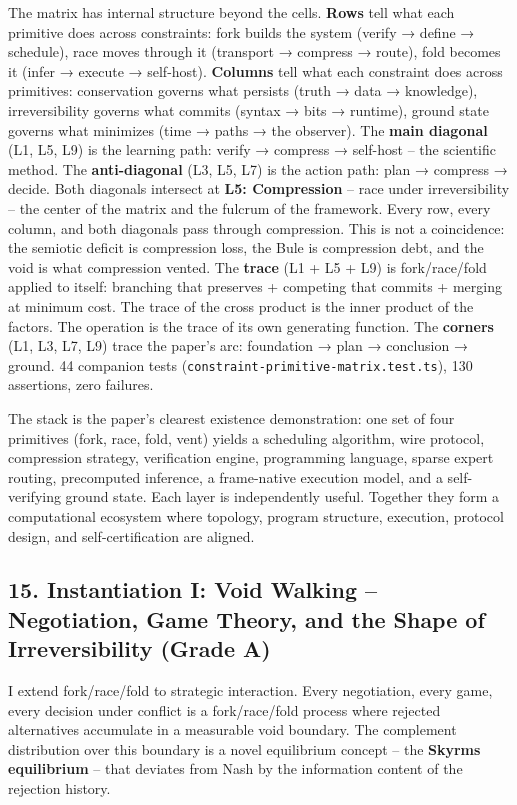 \documentclass[
  11pt,
]{article}
\begin{document}
The matrix has internal structure beyond the cells. \textbf{Rows} tell
what each primitive does across constraints: fork builds the system
(verify → define → schedule), race moves through it (transport →
compress → route), fold becomes it (infer → execute → self-host).
\textbf{Columns} tell what each constraint does across primitives:
conservation governs what persists (truth → data → knowledge),
irreversibility governs what commits (syntax → bits → runtime), ground
state governs what minimizes (time → paths → the observer). The
\textbf{main diagonal} (L1, L5, L9) is the learning path: verify →
compress → self-host -- the scientific method. The
\textbf{anti-diagonal} (L3, L5, L7) is the action path: plan → compress
→ decide. Both diagonals intersect at \textbf{L5: Compression} -- race
under irreversibility -- the center of the matrix and the fulcrum of the
framework. Every row, every column, and both diagonals pass through
compression. This is not a coincidence: the semiotic deficit is
compression loss, the Bule is compression debt, and the void is what
compression vented. The \textbf{trace} (L1 + L5 + L9) is fork/race/fold
applied to itself: branching that preserves + competing that commits +
merging at minimum cost. The trace of the cross product is the inner
product of the factors. The operation is the trace of its own generating
function. The \textbf{corners} (L1, L3, L7, L9) trace the paper's arc:
foundation → plan → conclusion → ground. 44 companion tests
(\texttt{constraint-primitive-matrix.test.ts}), 130 assertions, zero
failures.

The stack is the paper's clearest existence demonstration: one set of
four primitives (fork, race, fold, vent) yields a scheduling algorithm,
wire protocol, compression strategy, verification engine, programming
language, sparse expert routing, precomputed inference, a frame-native
execution model, and a self-verifying ground state. Each layer is
independently useful. Together they form a computational ecosystem where
topology, program structure, execution, protocol design, and
self-certification are aligned.

\subsection{15. Instantiation I: Void Walking -- Negotiation, Game
Theory, and the Shape of Irreversibility (Grade
A)}\label{instantiation-i-void-walking-negotiation-game-theory-and-the-shape-of-irreversibility-grade-a}

I extend fork/race/fold to strategic interaction. Every negotiation,
every game, every decision under conflict is a fork/race/fold process
where rejected alternatives accumulate in a measurable void boundary.
The complement distribution over this boundary is a novel equilibrium
concept -- the \textbf{Skyrms equilibrium} -- that deviates from Nash by
the information content of the rejection history.
\end{document}
